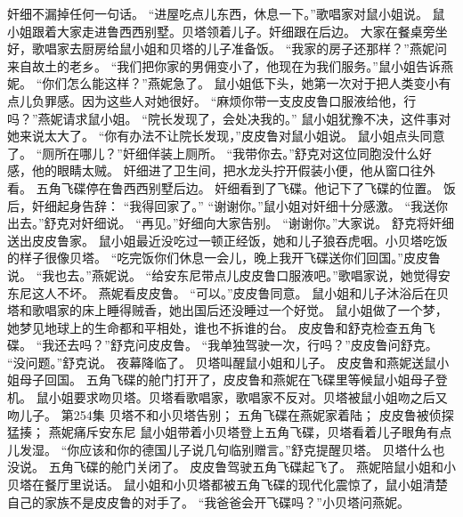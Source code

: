 \documentclass[a4paper,12pt,UTF8,twoside]{ctexbook}
\begin{document}
        奸细不漏掉任何一句话。  
        “进屋吃点儿东西，休息一下。”歌唱家对鼠小姐说。  
        鼠小姐跟着大家走进鲁西西别墅。贝塔领着儿子。奸细跟在后边。  
        大家在餐桌旁坐好，歌唱家去厨房给鼠小姐和贝塔的儿子准备饭。  
        “我家的房子还那样？”燕妮问来自故土的老乡。  
        “我们把你家的男佣变小了，他现在为我们服务。”鼠小姐告诉燕妮。  
        “你们怎么能这样？”燕妮急了。  
        鼠小姐低下头，她第一次对于把人类变小有点儿负罪感。因为这些人对她很好。  
        “麻烦你带一支皮皮鲁口服液给他，行吗？”燕妮请求鼠小姐。  
        “院长发现了，会处决我的。”  
        鼠小姐犹豫不决，这件事对她来说太大了。  
        “你有办法不让院长发现，”皮皮鲁对鼠小姐说。  
        鼠小姐点头同意了。  
        “厕所在哪儿？”奸细佯装上厕所。  
        “我带你去。”舒克对这位同胞没什么好感，他的眼睛太贼。  
        奸细进了卫生间，把水龙头拧开假装小便，他从窗口往外看。  
        五角飞碟停在鲁西西别墅后边。  
        奸细看到了飞碟。他记下了飞碟的位置。  
        饭后，奸细起身告辞：  
        “我得回家了。”  
        “谢谢你。”鼠小姐对奸细十分感激。  
        “我送你出去。”舒克对奸细说。  
        “再见。”好细向大家告别。  
        “谢谢你。”大家说。  
        舒克将奸细送出皮皮鲁家。  
        鼠小姐最近没吃过一顿正经饭，她和儿子狼吞虎咽。小贝塔吃饭的样子很像贝塔。  
        “吃完饭你们休息一会儿，晚上我开飞碟送你们回国。”皮皮鲁说。  
        “我也去。”燕妮说。  
        “给安东尼带点儿皮皮鲁口服液吧。”歌唱家说，她觉得安东尼这人不坏。  
        燕妮看皮皮鲁。  
        “可以。”皮皮鲁同意。  
        鼠小姐和儿子沐浴后在贝塔和歌唱家的床上睡得贼香，她出国后还没睡过一个好觉。  
        鼠小姐做了一个梦，她梦见地球上的生命都和平相处，谁也不拆谁的台。  
        皮皮鲁和舒克检查五角飞碟。  
        “我还去吗？”舒克问皮皮鲁。  
        “我单独驾驶一次，行吗？”皮皮鲁问舒克。  
        “没问题。”舒克说。  
        夜幕降临了。  
        贝塔叫醒鼠小姐和儿子。  
        皮皮鲁和燕妮送鼠小姐母子回国。  
        五角飞碟的舱门打开了，皮皮鲁和燕妮在飞碟里等候鼠小姐母子登机。  
        鼠小姐要求吻贝塔。贝塔看歌唱家，歌唱家不反对。贝塔被鼠小姐吻之后又吻儿子。          第254集  
        贝塔不和小贝塔告别；  
        五角飞碟在燕妮家着陆；  
        皮皮鲁被侦探猛揍；  
        燕妮痛斥安东尼    
        鼠小姐带着小贝塔登上五角飞碟，贝塔看着儿子眼角有点儿发湿。  
        “你应该和你的德国儿子说几句临别赠言。”舒克提醒贝塔。  
        贝塔什么也没说。  
        五角飞碟的舱门关闭了。  
        皮皮鲁驾驶五角飞碟起飞了。  
        燕妮陪鼠小姐和小贝塔在餐厅里说话。  
        鼠小姐和小贝塔都被五角飞碟的现代化震惊了，鼠小姐清楚自己的家族不是皮皮鲁的对手了。  
        “我爸爸会开飞碟吗？”小贝塔问燕妮。        
\end{document}
